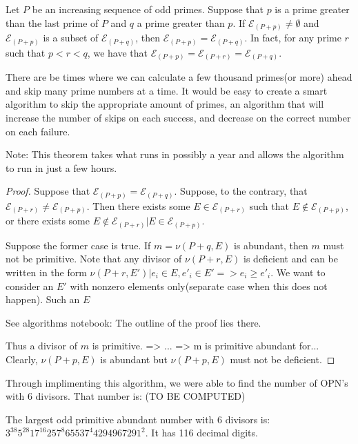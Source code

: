 \documentclass[../paper.tex]{subfiles}
\begin{document}
\begin{theorem} 
Let $P$ be an increasing sequence of odd primes. Suppose
that $p$ is a prime greater than the last prime of $P$ and $q$ a
prime greater than $p$. If $\mathcal{E}_{(P + p)} \neq 
\emptyset$ and $\mathcal{E}_{(P + p)}$ is a subset of 
$\mathcal{E}_{(P + q)}$, then $\mathcal{E}_{(P + p)} = 
\mathcal{E}_{(P + q)}$. In fact, for any prime $r$ such that $p <
r < q$, we have that $\mathcal{E}_{(P + p)} = \mathcal{E}_{(P +
r)} = \mathcal{E}_{(P + q)}$.
\end{theorem}

There are be times where we can
calculate a few thousand primes(or more) ahead and skip many prime
numbers at a time. It would be easy to create a smart algorithm to
skip the appropriate amount of primes, an algorithm that will
increase the number of skips on each success, and decrease on the
correct number on each failure. 

Note: This theorem takes what runs in possibly a year and allows
the algorithm to run in just a few hours.

\begin{proof}

Suppose that $\mathcal{E}_{(P + p)} = \mathcal{E}_{(P + q)}$.
Suppose, to the contrary, that $\mathcal{E}_{(P+r)} \neq
\mathcal{E}_{(P + p)}$. Then there exists some $E \in
\mathcal{E}_{(P + r)}$ such that $E \notin \mathcal{E}_{(P + p)}$, or there
exists some $E \notin \mathcal{E}_{(P + r)} | E \in \mathcal{E}_{(P +
p)}$. 

Suppose the former case is true. If $m = \nu(P + q, E)$ is abundant,
then $m$ must not be primitive. Note that any divisor of $\nu(P +
r, E)$ is deficient and can be written in the form $\nu(P + r, E')
| e_i \in E, e'_i \in E' => e_i \geq e'_i$. We want to consider
an $E'$ with nonzero elements only(separate case when this does
not happen). Such an $E$ 

See algorithms notebook: The outline of the proof lies there.

Thus a divisor of $m$ is
primitive. => ... => m is primitive abundant for...
Clearly, $\nu(P + p, E)$ is
abundant but $\nu(P + p, E)$ must not be deficient. 

\end{proof}

Through implimenting this algorithm, we were able to find the
number of OPN's with 6 divisors. That number is: (TO BE COMPUTED)


The largest odd primitive abundant number with 6 divisors is:
$3^{38} 5^{28} 17^{16} 257^8 65537^4 4294967291^2$. It has 116 decimal
digits.
\end{document}
